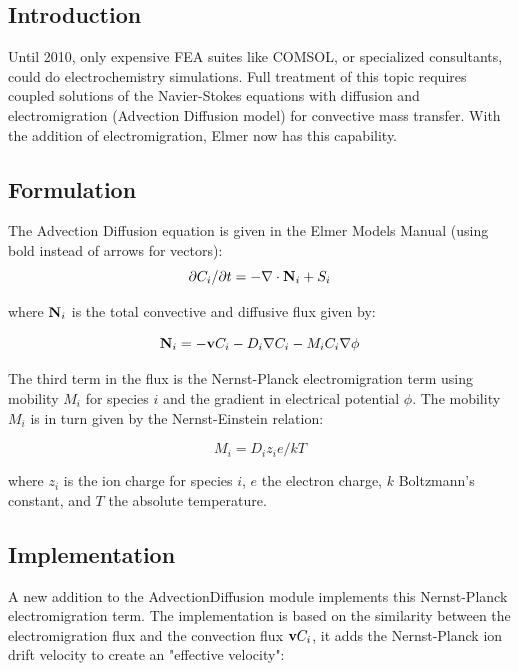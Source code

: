 \subsection{Introduction}

Until 2010, only expensive FEA suites like COMSOL, or specialized consultants, could do electrochemistry simulations. Full treatment of this topic requires coupled solutions of the Navier-Stokes equations with diffusion and electromigration (Advection Diffusion model) for convective mass transfer. With the addition of electromigration, Elmer now has this capability. 

\subsection{Formulation}

The Advection Diffusion equation is given in the Elmer Models Manual (using bold instead of arrows for vectors):\\

\begin{equation}
\partial C_i/ \partial t =  - \nabla \cdot \bold N_i + S_i
\end{equation}

where $\bold N_i$ is the total convective and diffusive flux given by:

\begin{equation}
\bold N_i = -\bold v C_i - D_i \nabla C_i - M_i C_i \nabla \phi
\end{equation}

The third term in the flux is the Nernst-Planck electromigration term using mobility $M_i$ for species $i$ and the gradient in electrical potential $\phi $. The mobility $M_i$ is in turn given by the Nernst-Einstein relation:

\begin{equation}
M_i = D_i z_i e/kT
\end{equation}

where $z_i$ is the ion charge for species $i$, $e$ the electron charge, $k$ Boltzmann's constant, and $T$ the absolute temperature. 

\subsection{Implementation}

A new addition to the AdvectionDiffusion module implements this Nernst-Planck electromigration term. The implementation is based on the similarity between the electromigration flux and the convection flux $\bold v C_i$, it adds the Nernst-Planck ion drift velocity to create an "effective velocity":

